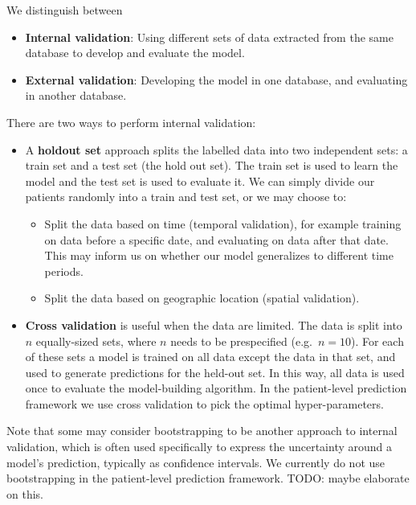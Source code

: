 \documentclass[11pt]{book}
\providecommand{\tightlist}{%
  \setlength{\itemsep}{0pt}\setlength{\parskip}{0pt}}
\theoremstyle{definition}
\theoremstyle{definition}
\theoremstyle{definition}
\theoremstyle{remark}
\begin{document}
We distinguish between

\begin{itemize}
\tightlist
\item
  \textbf{Internal validation}: Using different sets of data extracted from the same database to develop and evaluate the model.
\item
  \textbf{External validation}: Developing the model in one database, and evaluating in another database.  
\end{itemize}

There are two ways to perform internal validation:

\begin{itemize}
\tightlist
\item
  A \textbf{holdout set} approach splits the labelled data into two independent sets: a train set and a test set (the hold out set). The train set is used to learn the model and the test set is used to evaluate it. We can simply divide our patients randomly into a train and test set, or we may choose to:

  \begin{itemize}
  \tightlist
  \item
    Split the data based on time (temporal validation), for example training on data before a specific date, and evaluating on data after that date. This may inform us on whether our model generalizes to different time periods.
  \item
    Split the data based on geographic location (spatial validation).  
  \end{itemize}
\item
  \textbf{Cross validation} is useful when the data are limited. The data is split into \(n\) equally-sized sets, where \(n\) needs to be prespecified (e.g.~\(n=10\)). For each of these sets a model is trained on all data except the data in that set, and used to generate predictions for the held-out set. In this way, all data is used once to evaluate the model-building algorithm. In the patient-level prediction framework we use cross validation to pick the optimal hyper-parameters. 
\end{itemize}

Note that some may consider bootstrapping to be another approach to internal validation, which is often used specifically to express the uncertainty around a model's prediction, typically as confidence intervals. We currently do not use bootstrapping in the patient-level prediction framework. TODO: maybe elaborate on this. 
\end{document}
